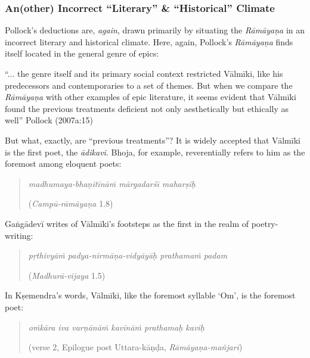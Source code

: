 \subsubsection{An(other) Incorrect “Literary” \& “Historical” Climate}\label{sec1.2.3.1}

Pollock’s deductions are, {\sl again}, drawn primarily by situating the {\sl Rāmāyaṇa} in an incorrect literary and historical climate. Here, again, Pollock’s {\sl Rāmāyaṇa} finds itself located in the general genre of epics:

\begin{myquote}
“... the genre itself and its primary social context restricted Vālmīki, like his predecessors and contemporaries to a set of themes. But when we compare the {\sl Rāmāyaṇa} with other examples of epic literature, it seems evident that Vālmīki found the previous treatments deficient not only aesthetically but ethically as well”
\hfill Pollock (2007a:15)
\end{myquote}

But what, exactly, are “previous treatments”? It is widely accepted that Vālmīki is the first poet, the {\sl ādikavi}. Bhoja, for example, reverentially refers to him as the foremost among eloquent poets:

\begin{quote}
{\sl madhumaya-bhaṇitīnāṁ mārgadarśī maharṣiḥ} 

\hfill ({\sl Campū-rāmāyaṇa} 1.8)
\end{quote}

Gaṅgādevī writes of Vālmīki’s footsteps as the first in the realm of poetry-writing:   

\begin{quote}
{\sl pṛthivyāṁ padya-nirmāṇa-vidyāyāḥ prathamaṁ padam} 

\hfill ({\sl Madhurā-vijaya} 1.5) 
\end{quote}

In Kṣemendra’s words, Vālmīki, like the foremost syllable ‘Om’, is the foremost poet:

\begin{quote}
{\sl oṁkāra iva varṇānāṁ kavīnāṁ prathamaḥ kaviḥ}

\hfill (verse 2, Epilogue post Uttara-kāṇḍa, {\sl Rāmāyaṇa-mañjarī})
\end{quote}

